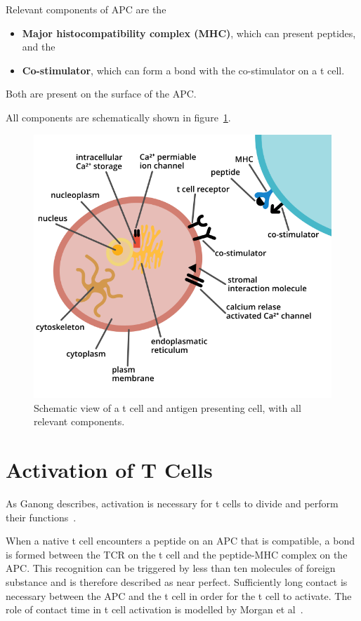 Relevant components of APC are the
\begin{itemize}
	\item \textbf{Major histocompatibility complex (MHC)}, which can present peptides, and the
	\item \textbf{Co-stimulator}, which can form a bond with the co-stimulator on a t cell.
\end{itemize}

Both are present on the surface of the APC.

All components are schematically shown in figure~\ref{fig:tcellcomponents}.

\begin{figure}[h]
	\centering
	\includegraphics[width=\linewidth]{fig/t_cell_components}
	\caption{Schematic view of a t cell and antigen presenting cell, with all relevant components.}
	\label{fig:tcellcomponents}
\end{figure}

\newpage
\section{Activation of T Cells}
\label{sec:t-cell/activation}

As Ganong describes, activation is necessary for t cells to divide and perform their functions~\cite{Ganong1997}.

When a native t cell encounters a peptide on an APC that is compatible, a bond is formed between the TCR on the t cell and the peptide-MHC complex on the APC. This recognition can be triggered by less than ten molecules of foreign substance and is therefore described as near perfect. Sufficiently long contact is necessary between the APC and the t cell in order for the t cell to activate. The role of contact time in t cell activation is modelled by Morgan et al~\cite{morgan2023}.

